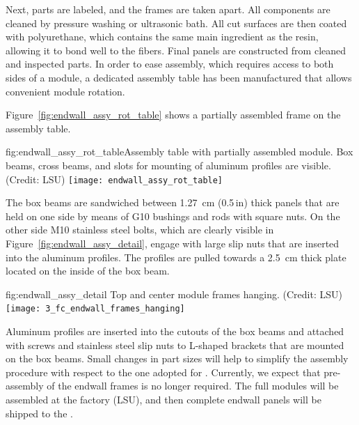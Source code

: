 Next, parts are labeled, and the frames are taken apart. All components are cleaned by pressure washing or ultrasonic bath. All cut  surfaces are then coated with polyurethane, which contains the same main ingredient as the  resin, allowing it to bond well to the  fibers. Final panels are constructed from cleaned and inspected parts. In order to ease assembly, which requires access to both sides of a module,
a dedicated assembly table has been manufactured that allows convenient module rotation. 

Figure~\ref{fig:endwall_assy_rot_table} shows a partially assembled   frame on the assembly table.
\begin{dunefigure}{fig:endwall_assy_rot_table}{Assembly table with partially assembled  module. Box beams, cross beams, and slots for mounting of aluminum profiles are visible. (Credit: LSU)}
 \texttt{[image: endwall\_assy\_rot\_table]}
 \end{dunefigure}
The  box beams are sandwiched between \SI{1.27}{\cm} (\num{0.5}\,in) thick  panels that are held on one side by means of G10 bushings and rods with square nuts.
On the other side M10 stainless steel bolts, which are clearly visible in Figure~\ref{fig:endwall_assy_detail},  
engage with large slip nuts that are inserted into the aluminum profiles. The profiles 
are pulled towards a \SI{2.5}{\cm} thick  plate located 
on the inside of the box beam.
%

\begin{dunefigure} %
{fig:endwall_assy_detail}{%
Top and center  module frames hanging. (Credit: LSU)}
\texttt{[image: 3\_fc\_endwall\_frames\_hanging]}
\end{dunefigure}


Aluminum profiles are inserted into the cutouts of the box beams and attached with screws and stainless steel slip nuts to L-shaped  brackets that are mounted on the  box beams. Small changes in part sizes will help to simplify the assembly  procedure with respect to the one adopted for . Currently, we expect that pre-assembly of the  endwall frames is no longer required. The full modules will be assembled at the factory (LSU), and then complete  endwall panels will be shipped to the . 



